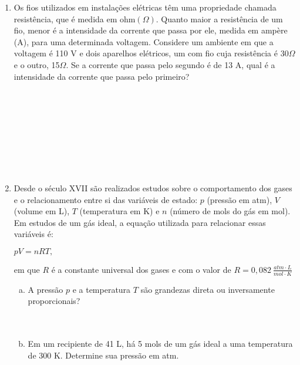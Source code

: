 \documentclass[a4paper,14pt]{article}
\begin{document}
\begin{multicols}{2}
\begin{enumerate}
		    \item Os fios utilizados em instalações elétricas têm uma propriedade chamada resistência, que é medida em ohm$(\Omega)$. Quanto maior a resistência de um fio, menor é a intensidade da corrente que passa por ele, medida em ampère (A), para uma determinada voltagem. Considere um ambiente em que a voltagem é 110 V e dois aparelhos elétricos, um com fio cuja resistência é 30$\Omega$ e o outro, 15$\Omega$. Se a corrente que passa pelo segundo é de 13 A, qual é a intensidade da corrente que passa pelo primeiro? \\\\\\\\\\\\\\\\\\
		    \item Desde o século XVII são realizados estudos sobre o comportamento dos gases e o relacionamento entre si das variáveis de estado: $p$ (pressão em atm), $V$(volume em L), $T$ (temperatura em K) e $n$ (número de mols do gás em mol).
		    Em estudos de um gás ideal, a equação utilizada para relacionar essas variáveis é:
		    \begin{center}
		    	$pV = nRT,$
		    \end{center}
	    	em que $R$ é a constante universal dos gases e com o valor de $R = 0,082~\frac{atm \cdot L}{mol \cdot K}$
	    	\begin{enumerate}[a)]
	    		\item A pressão $p$ e a temperatura $T$ são grandezas direta ou inversamente proporcionais? \\\\\\
	    		\item Em um recipiente de 41 L, há 5 mols de um gás ideal a uma temperatura de 300 K. Determine sua pressão em atm.  \\\\\\\\\\\\\\\\\\\\\\\\\\\\

\end{enumerate}
\end{enumerate}
\end{multicols}
\end{document}
